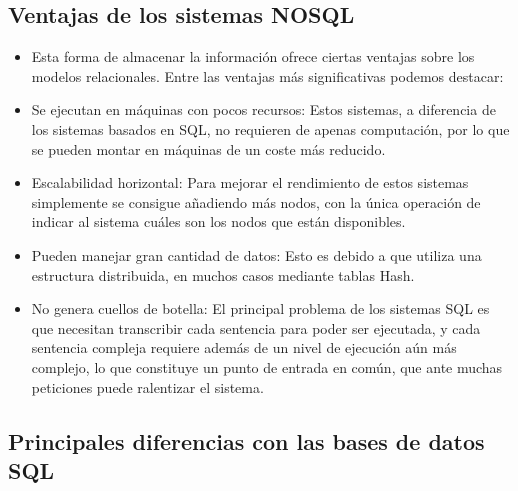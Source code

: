 \documentclass[twoside,twocolumn]{article}
\begin{document}
\subsection{Ventajas de los sistemas NOSQL}
\begin{itemize}
    \item 	Esta forma de almacenar la información ofrece ciertas ventajas sobre los modelos relacionales. Entre las ventajas más significativas podemos destacar: 
    \item 	Se ejecutan en máquinas con pocos recursos: Estos sistemas, a diferencia de los sistemas basados en SQL, no requieren de apenas computación, por lo que se pueden montar en máquinas de un coste más reducido. 
    \item 	Escalabilidad horizontal: Para mejorar el rendimiento de estos sistemas simplemente se consigue añadiendo más nodos, con la única operación de indicar al sistema cuáles son los nodos que están disponibles. 
    \item 	Pueden manejar gran cantidad de datos: Esto es debido a que utiliza una estructura distribuida, en muchos casos mediante tablas Hash.
    \item 	No genera cuellos de botella: El principal problema de los sistemas SQL es que necesitan transcribir cada sentencia para poder ser ejecutada, y cada sentencia compleja requiere además de un nivel de ejecución aún más complejo, lo que constituye un punto de entrada en común, que ante muchas peticiones puede ralentizar el sistema.
    
\end{itemize}

   
\subsection{Principales diferencias con las bases de datos SQL}
\end{document}
